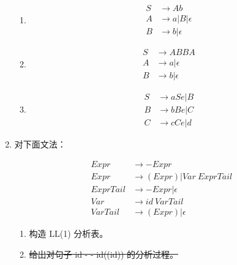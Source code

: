 \begin{enumerate}
\begin{enumerate}
        \item \begin{align*}
            S & \to Ab \\
            A & \to a | B | \epsilon \\
            B & \to b | \epsilon
        \end{align*}
        
        \item \begin{align*}
            S & \to ABBA \\
            A & \to a | \epsilon \\
            B & \to b | \epsilon
        \end{align*}
        
        \item \begin{align*}
            S & \to aSe | B \\
            B & \to bBe | C \\
            C & \to cCe | d
        \end{align*}
        
    \end{enumerate}
    
    \item 对下面文法：
    
    \begin{align*}
        Expr & \to -Expr \\
        Expr & \to (Expr) | Var\ ExprTail \\
        ExprTail & \to -Expr | \epsilon \\
        Var & \to id\ VarTail \\
        VarTail & \to (Expr) | \epsilon
    \end{align*}
    
    \begin{enumerate}
        \item 构造 LL(1) 分析表。
        \item \sout{给出对句子 id - - id((id)) 的分析过程。}
    \end{enumerate}
    
\end{enumerate}